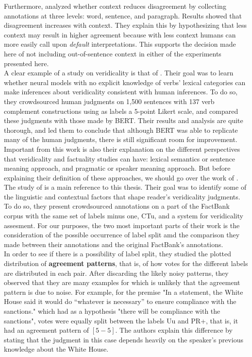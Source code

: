 Furthermore, \citet{pavlick2019inherent} analyzed whether context reduces disagreement by collecting annotations at three levels: word, sentence, and paragraph. Results showed that disagreement increases with context. They explain this by hypothesizing that less context may result in higher agreement because with less context humans can more easily call upon \textit{default} interpretations. This supports the decision made here of not including out-of-sentence context in either of the experiments presented here.\\

A clear example of a study on veridicality is that of \citet{ross2019well}. Their goal was to learn whether neural models with no explicit knowledge of verbs' lexical categories can make inferences about veridicality consistent with human inferences. To do so, they crowdsourced human judgments on 1,500 sentences with 137 verb complement constructions using as labels a 5-point Likert scale, and compared these judgments with those made by BERT. Their results and analysis are quite thorough, and led them to conclude that although BERT was able to replicate many of the human judgments, there is still significant room for improvement. Important from this work is also their explanation on the different perspectives that veridicality and factuality studies can have: lexical semantics or sentence meaning approach, and pragmatic or speaker meaning approach. But before explaining their definition of these approaches, we should go over the work of \citet{de2012did}.\\

The study of \citet{de2012did} is a main reference to this thesis. Their goal was to identify some of the linguistic and contextual factors that shape reader's veridicality judgments. To do so, they present crowdsourced annotations on a part of the FactBank corpus with the same set of labels minus one, CTu, and a system for veridicality assesment. For our purposes, the two most important parts of their work is the consideration of the possible occurrence of label split amd the comparison they made between their annotations and the original FactBank's annotations.\\

In order to see if there is a possibility of label split, they studied the plotted distribution of \textbf{agreement patterns}, that is, of how votes for the different labels are distributed in each pair. After discarding the likely noisy patterns, they observed that they are many examples for which is unlikely that the agreement pattern is due to noise. For example, for the premise "In a statement, the White House said it would do “whatever is necessary” to ensure compliance with the sanctions." which had as a hypothesis "there will be compliance with the sanctions", votes were equally split between the labels Uu and PR+, that is, it had an agreement pattern of $[5-5]$. The authors explain this difference by stating that the judgment in this case depends heavily on the speaker's previous knowledge about the White House.\\ 

